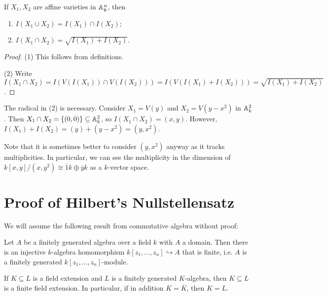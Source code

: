 \begin{corollary}
  If $X_1, X_2$ are affine varieties
  in $\mathbb{A}_k^n$, then
  \begin{enumerate}
    \item $I(X_1 \cup X_2) = I(X_1) \cap I(X_2)$;
    \item $I(X_1 \cap X_2) = \sqrt{I(X_1) + I(X_2)}$.
  \end{enumerate}
\end{corollary}

\begin{proof}
  (1) This follows from definitions.

  (2) Write $I(X_1 \cap X_2) = I(V(I(X_1)) \cap V(I(X_2))) = I(V(I(X_1) + I(X_2))) = \sqrt{I(X_1) + I(X_2)}$.
\end{proof}

\begin{example}
  The radical in (2) is necessary. Consider
  $X_1 = V(y)$ and $X_2 = V(y - x^2)$
  in $\mathbb{A}_k^2$. Then
  $X_1 \cap X_2 = \{(0, 0)\} \subseteq \mathbb{A}_k^2$,
  so $I(X_1 \cap X_2) = (x, y)$.
  However, $I(X_1) + I(X_2) = (y) + (y - x^2) = (y, x^2)$.

  Note that it is sometimes better to
  consider $(y, x^2)$ anyway as
  it tracks multiplicities.
  In particular, we can see the multiplicity
  in the dimension of
  $k[x, y] / (x, y^2) \cong \overline{1} k \oplus \overline{y} k$
  as a $k$-vector space.
\end{example}

\section{Proof of Hilbert's Nullstellensatz}

We will assume the following result
from commutative algebra without proof:
\begin{theorem}
  Let $A$ be a finitely generated algebra
  over a field $k$ with $A$ a domain.
  Then there is an injective $k$-algebra
  homomorphism
  $k[z_1, \dots, z_n] \hookrightarrow A$
  that is finite, i.e. $A$ is a
  finitely generated
  $k[z_1, \dots, z_n]$-module.
\end{theorem}

\begin{corollary}
  \label{cor:finite-extension}
  If $K \subseteq L$ is a field extension
  and $L$ is a finitely generated $K$-algebra,
  then $K \subseteq L$ is a finite field
  extension. In particular,
  if in addition $K = \overline{K}$, then
  $K = L$.
\end{corollary}

